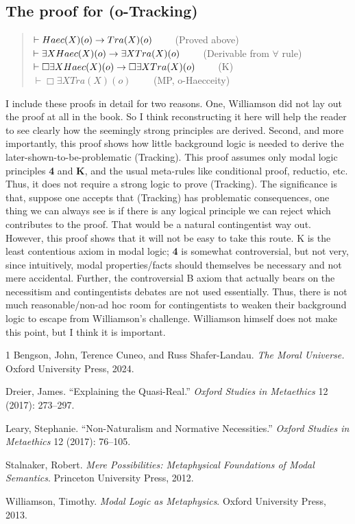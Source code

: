\subsection{The proof for (o-Tracking)} 

\begin{quote}
$\vdash Haec(X)(o) \rightarrow Tra(X)(o)$ \ \ \ \ (Proved above) \\
$\vdash \exists X Haec(X)(o) \rightarrow \exists X Tra(X)(o)$ \ \ \ \ (Derivable from $\forall$ rule) \\
$\vdash \Box \exists X Haec(X)(o) \rightarrow \Box \exists X Tra(X)(o)$ \ \ \ \ (K)\\
$\vdash \Box \exists X Tra(X)(o)$ \ \ \ \ (MP, o-Haecceity) 
\end{quote}


\noindent I include these proofs in detail for two reasons. One, Williamson did not lay out the proof at all in the book. So I think reconstructing it here will help the reader to see clearly how the seemingly strong principles are derived. Second, and more importantly, this proof shows how little background logic is needed to derive the later-shown-to-be-problematic (Tracking). This proof assumes only modal logic principles \textbf{4} and \textbf{K}, and the usual meta-rules like conditional proof, reductio, etc. Thus, it  does not require a strong logic to prove (Tracking). The significance is that, suppose one accepts that (Tracking) has problematic consequences, one thing we can always see is if there is any logical principle we can reject which contributes to the proof. That would be a natural contingentist way out. However, this proof shows that it will not be easy to take this route. K is the least contentious axiom in modal logic; \textbf{4} is somewhat controversial, but not very, since intuitively, modal properties/facts should themselves be necessary and not mere accidental. Further, the controversial B axiom that actually bears on the necessitism and contingentists debates are not used essentially. Thus, there is not much reasonable/non-ad hoc room for contingentists to weaken their background logic to escape from Williamson's challenge. Williamson himself does not make this point, but I think it is important. 


\begin{hangparas}{\hangingindent}{1}
  Bengson, John, Terence Cuneo, and Russ Shafer-Landau. \textit{The Moral Universe.} Oxford University Press, 2024.

  Dreier, James. ``Explaining the Quasi-Real.'' \textit{Oxford Studies in Metaethics} 12 (2017): 273--297.

  Leary, Stephanie. ``Non-Naturalism and Normative Necessities.'' \textit{Oxford Studies in Metaethics} 12 (2017): 76--105.

  Stalnaker, Robert. \textit{Mere Possibilities: Metaphysical Foundations of Modal Semantics}. Princeton University Press, 2012.

  Williamson, Timothy. \textit{Modal Logic as Metaphysics}. Oxford University Press, 2013.
  \end{hangparas}
